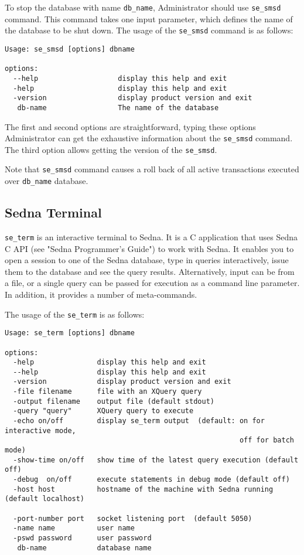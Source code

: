 \documentclass[a4paper,12pt]{article}
\begin{document}
To stop the database with name \verb!db_name!, Administrator should use \verb!se_smsd! command. This command takes one input parameter, which defines the name of the database to be shut down. The usage of the \verb!se_smsd! command is as follows:

\begin{verbatim}
Usage: se_smsd [options] dbname

options:
  --help                   display this help and exit
  -help                    display this help and exit
  -version                 display product version and exit
   db-name                 The name of the database
\end{verbatim}

The first and second options are straightforward, typing these options Administrator can get the exhaustive information about the \verb!se_smsd! command.
The third option allows getting the version of the \verb!se_smsd!.

Note that \verb!se_smsd! command causes a roll back of all active transactions executed over \verb!db_name! database.


\subsection{Sedna Terminal}
\label{terminal}
\verb!se_term! is an interactive terminal to Sedna. It is a C application that uses Sedna C API (see "Sedna Programmer's Guide") to work with Sedna. It enables you to open a session to one of the Sedna database, type in queries interactively, issue them to the database and see the query results. Alternatively, input can be from a file, or a single query can be passed for execution as a command line parameter. In addition, it provides a number of meta-commands. 

The usage of the \verb!se_term! is as follows:

\begin{verbatim}
Usage: se_term [options] dbname

options:
  -help			      display this help and exit
  --help		      display this help and exit
  -version		      display product version and exit
  -file filename	  file with an XQuery query			  
  -output filename	  output file (default stdout)
  -query "query"	  XQuery query to execute		
  -echo on/off		  display se_term output  (default: on for interactive mode,
                                                        off for batch mode)
  -show-time on/off	  show time of the latest query execution (default off)
  -debug  on/off      execute statements in debug mode (default off)
  -host host		  hostname of the machine with Sedna running (default localhost)
		
  -port-number port	  socket listening port  (default 5050)
  -name name		  user name 
  -pswd password	  user password 
   db-name		      database name
\end{verbatim}
\end{document}
